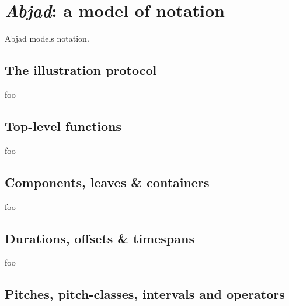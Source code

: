 \chapter{\emph{Abjad}: a model of notation}

Abjad models notation.

\section{The illustration protocol}

foo

\section{Top-level functions}

foo

\section{Components, leaves \& containers}

foo

\section{Durations, offsets \& timespans}

foo

\section{Pitches, pitch-classes, intervals and operators}

